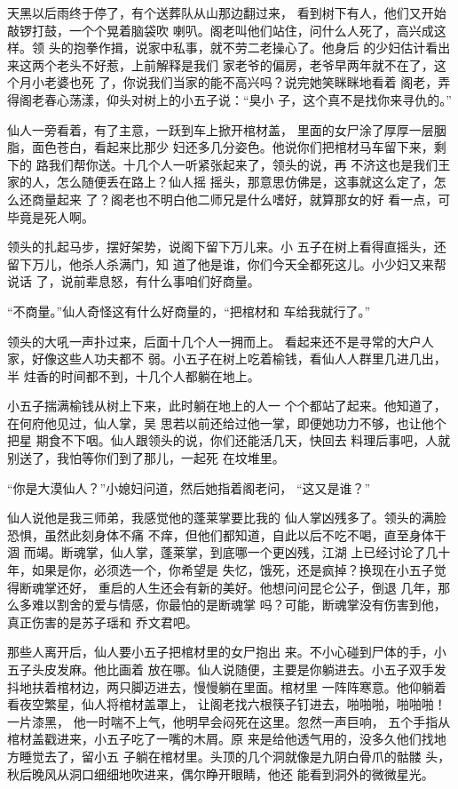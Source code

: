 天黑以后雨终于停了，有个送葬队从山那边翻过来，
看到树下有人，他们又开始敲锣打鼓，一个个晃着脑袋吹
喇叭。阁老叫他们站住，问什么人死了，高兴成这样。领
头的抱拳作揖，说家中私事，就不劳二老操心了。他身后
的少妇估计看出来这两个老头不好惹，上前解释是我们
家老爷的偏房，老爷早两年就不在了，这个月小老婆也死
了，你说我们当家的能不高兴吗？说完她笑眯眯地看着
阁老，弄得阁老春心荡漾，仰头对树上的小五子说：“臭小
子，这个真不是找你来寻仇的。”

仙人一旁看着，有了主意，一跃到车上掀开棺材盖，
里面的女尸涂了厚厚一层胭脂，面色苍白，看起来比那少
妇还多几分姿色。他说你们把棺材马车留下来，剩下的
路我们帮你送。十几个人一听紧张起来了，领头的说，再
不济这也是我们王家的人，怎么随便丢在路上？仙人摇
摇头，那意思仿佛是，这事就这么定了，怎么还商量起来
了？阁老也不明白他二师兄是什么嗜好，就算那女的好
看一点，可毕竟是死人啊。

领头的扎起马步，摆好架势，说阁下留下万儿来。小
五子在树上看得直摇头，还留下万儿，他杀人杀满门，知
道了他是谁，你们今天全都死这儿。小少妇又来帮说话
了，说前辈息怒，有什么事咱们好商量。

“不商量。”仙人奇怪这有什么好商量的，“把棺材和
车给我就行了。”

领头的大吼一声扑过来，后面十几个人一拥而上。
看起来还不是寻常的大户人家，好像这些人功夫都不
弱。小五子在树上吃着榆钱，看仙人人群里几进几出，半
炷香的时间都不到，十几个人都躺在地上。

小五子揣满榆钱从树上下来，此时躺在地上的人一
个个都站了起来。他知道了，在何府他见过，仙人掌，吴
思若以前还给过他一掌，即便她功力不够，也让他个把星
期食不下咽。仙人跟领头的说，你们还能活几天，快回去
料理后事吧，人就别送了，我怕等你们到了那儿，一起死
在坟堆里。

“你是大漠仙人？”小媳妇问道，然后她指着阁老问，
“这又是谁？”

仙人说他是我三师弟，我感觉他的蓬莱掌要比我的
仙人掌凶残多了。领头的满脸恐惧，虽然此刻身体不痛
不痒，但他们都知道，自此以后不吃不喝，直至身体干涸
而竭。断魂掌，仙人掌，蓬莱掌，到底哪一个更凶残，江湖
上已经讨论了几十年，如果是你，必须选一个，你希望是
失忆，饿死，还是疯掉？换现在小五子觉得断魂掌还好，
重启的人生还会有新的美好。他想问问昆仑公子，倒退
几年，那么多难以割舍的爱与情感，你最怕的是断魂掌
吗？可能，断魂掌没有伤害到他，真正伤害的是苏子瑶和
乔文君吧。

那些人离开后，仙人要小五子把棺材里的女尸抱出
来。不小心碰到尸体的手，小五子头皮发麻。他比画着
放在哪。仙人说随便，主要是你躺进去。小五子双手发
抖地扶着棺材边，两只脚迈进去，慢慢躺在里面。棺材里
一阵阵寒意。他仰躺着看夜空繁星，仙人将棺材盖罩上，
让阁老找六根筷子钉进去，啪啪啪，啪啪啪！一片漆黑，
他一时喘不上气，他明早会闷死在这里。忽然一声巨响，
五个手指从棺材盖戳进来，小五子吃了一嘴的木屑。原
来是给他透气用的，没多久他们找地方睡觉去了，留小五
子躺在棺材里。头顶的几个洞就像是九阴白骨爪的骷髅
头，秋后晚风从洞口细细地吹进来，偶尔睁开眼睛，他还
能看到洞外的微微星光。
\newline

